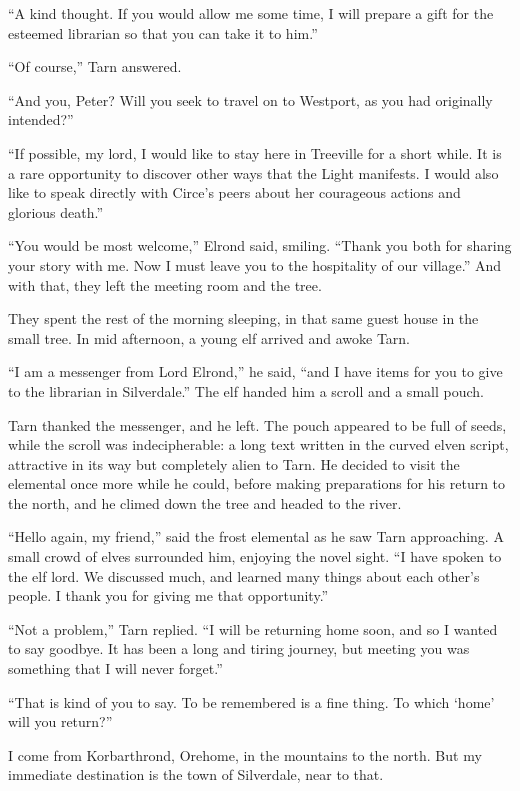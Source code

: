 ``A kind thought.  If you would allow me some time, I will prepare a gift for the esteemed librarian so that you can take it to him.''

``Of course,'' Tarn answered.

``And you, Peter?  Will you seek to travel on to Westport, as you had originally intended?''

``If possible, my lord, I would like to stay here in Treeville for a short while.  It is a rare opportunity to discover other ways that the Light manifests.  I would also like to speak directly with Circe's peers about her courageous actions and glorious death.''

``You would be most welcome,'' Elrond said, smiling.  ``Thank you both for sharing your story with me.  Now I must leave you to the hospitality of our village.''  And with that, they left the meeting room and the tree.

They spent the rest of the morning sleeping, in that same guest house in the small tree.  In mid afternoon, a young elf arrived and awoke Tarn.

``I am a messenger from Lord Elrond,'' he said, ``and I have items for you to give to the librarian in Silverdale.''  The elf handed him a scroll and a small pouch.

Tarn thanked the messenger, and he left.  The pouch appeared to be full of seeds, while the scroll was indecipherable: a long text written in the curved elven script, attractive in its way but completely alien to Tarn.  He decided to visit the elemental once more while he could, before making preparations for his return to the north, and he climed down the tree and headed to the river.

``Hello again, my friend,'' said the frost elemental as he saw Tarn approaching.  A small crowd of elves surrounded him, enjoying the novel sight.  ``I have spoken to the elf lord.  We discussed much, and learned many things about each other's people.  I thank you for giving me that opportunity.''

``Not a problem,'' Tarn replied.  ``I will be returning home soon, and so I wanted to say goodbye.  It has been a long and tiring journey, but meeting you was something that I will never forget.''

``That is kind of you to say.  To be remembered is a fine thing.  To which `home' will you return?''

I come from Korbarthrond, Orehome, in the mountains to the north.  But my immediate destination is the town of Silverdale, near to that.

